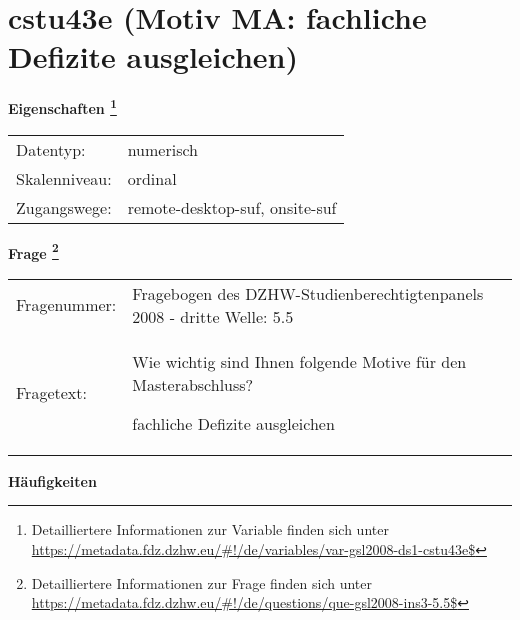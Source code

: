 
    \setcounter{footnote}{0}

    \vspace*{-1.8cm}
	\section{cstu43e (Motiv MA: fachliche Defizite ausgleichen)}
	\label{section:cstu43e}



    \vspace*{0.5cm}
    \noindent\textbf{Eigenschaften
	\footnote{Detailliertere Informationen zur Variable finden sich unter
		\url{https://metadata.fdz.dzhw.eu/\#!/de/variables/var-gsl2008-ds1-cstu43e$}}}\\
	\begin{tabularx}{\hsize}{@{}lX}
	Datentyp: & numerisch \\
	Skalenniveau: & ordinal \\
	Zugangswege: &
	  remote-desktop-suf, 
	  onsite-suf
 \\
    \end{tabularx}



				\vspace*{0.5cm}
                \noindent\textbf{Frage
	                \footnote{Detailliertere Informationen zur Frage finden sich unter
		              \url{https://metadata.fdz.dzhw.eu/\#!/de/questions/que-gsl2008-ins3-5.5$}}}\\
				\begin{tabularx}{\hsize}{@{}lX}
					Fragenummer: &
					  Fragebogen des DZHW-Studienberechtigtenpanels 2008 - dritte Welle:
					  5.5
 \\
					Fragetext: & Wie wichtig sind Ihnen folgende Motive für den Masterabschluss?\par  fachliche Defizite ausgleichen \\
				\end{tabularx}





        		\vspace*{0.5cm}
                \noindent\textbf{Häufigkeiten}

